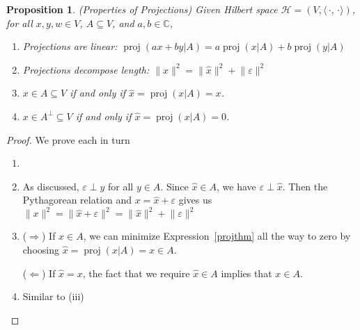 \documentclass[12pt]{article}
\numberwithin{equation}{section} %
\theoremstyle{plain}
\newtheorem{prop}[thm]{Proposition}
\theoremstyle{definition}
\theoremstyle{remark}
\newcommand{\proj}{\operatorname{proj}}
\newcommand{\calH}{\mathcal{H}}
\newcommand{\C}{\mathbb{C}}
\begin{document}
\begin{prop}\emph{(Properties of Projections)}
Given Hilbert space $\calH=(V,\langle\,\cdot,\,\cdot\rangle)$,
for all $x,y,w\in V$, $A\subseteq V$, and $a,b\in\C$,
\begin{enumerate}[label=\emph{(\roman*)}]
  \item \emph{Projections are linear}:
    $\proj(ax+by|A) = a\proj(x|A)+b\proj(y|A)$
  \item \emph{Projections decompose length}:
    $\lVert x\rVert^2
    = \lVert\hat{x}\rVert^2 + \lVert \varepsilon\rVert^2$
  \item $x\in A\subseteq V$ if and only if $\hat{x}=\proj(x|A)=x$.
  \item $x\in A^\perp \subseteq V$ if and only if
    $\hat{x}=\proj(x|A)=0$.
\end{enumerate}
\end{prop}
\clearpage
\begin{proof}
We prove each in turn
\begin{enumerate}[label=(\roman*)]
  \item
  \item As discussed, $\varepsilon\perp y$ for all $y\in A$.
    Since $\hat{x}\in A$, we have $\varepsilon\perp \hat{x}$.
    Then the Pythagorean relation and $x=\hat{x}+\varepsilon$ gives us
    $\lVert x\rVert^2 = \lVert \hat{x}+\varepsilon\rVert^2 =\lVert
    \hat{x}\rVert^2 + \lVert \varepsilon\rVert^2$
  \item
    ($\Rightarrow$)
    If $x\in A$, we can minimize Expression~\ref{projthm}
    all the way to zero by choosing $\hat{x}=\proj(x|A)=x\in A$.

    ($\Leftarrow$) If $\hat{x}=x$, the fact that we require
    $\hat{x}\in A$ implies that $x\in A$.
  \item Similar to (iii)
\end{enumerate}
\end{proof}
\end{document}
